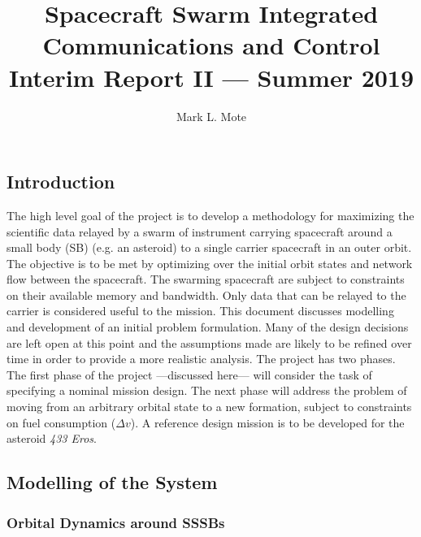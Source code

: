 \documentclass[12pt]{article}
\title{\Large{Spacecraft Swarm Integrated Communications and Control} \\[0.5cm] \large{Interim Report II --- Summer 2019 }}
\author{Mark L. Mote}
\begin{document}
\date{ }
\maketitle
\newpage



\subsection*{Introduction}

The high level goal of the project is to develop a methodology for maximizing the scientific data relayed by a swarm of instrument carrying spacecraft around a small body (SB) (e.g. an asteroid) to a single carrier spacecraft in an outer orbit. The objective is to be met by optimizing over the initial orbit states and network flow between the spacecraft. The swarming spacecraft are subject to constraints on their available memory and bandwidth. Only data that can be relayed to the carrier is considered useful to the mission. This document discusses modelling and development of an initial  problem formulation. Many of the design decisions are left open at this point and the assumptions made are likely to be refined over time in order to provide a more realistic analysis. The project has two phases. The first phase of the project ---discussed here--- will consider the task of specifying a nominal mission design. The next phase will address the problem of moving from an arbitrary orbital state to a new formation, subject to constraints on fuel consumption ($\Delta v$). A reference design mission is to be developed for the asteroid \textit{433 Eros}.

\subsection*{Modelling of the System}

\subsubsection*{Orbital Dynamics around SSSBs}
\end{document}
